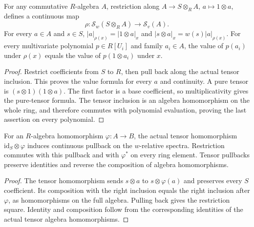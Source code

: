 \begin{theorem}
\label{spectrum:base-change-restriction}
\leanok
{}
For any commutative $R$-algebra $A$, restriction along
$A\to S\otimes_R A$, $a\mapsto1\otimes a$, defines a continuous map
\[
 \rho:\mathcal S_w(S\otimes_R A)\longrightarrow\mathcal S_v(A).
\]
For every $a\in A$ and $s\in S$,
$|a|_{\rho(x)}=|1\otimes a|_x$ and
$|s\otimes a|_x=w(s)|a|_{\rho(x)}$.
For every multivariate polynomial $p\in R[U_i]$ and family $a_i\in A$,
the value of $p(a_i)$ under $\rho(x)$ equals the value of
$p(1\otimes a_i)$ under $x$.
\end{theorem}
\begin{proof}
Restrict coefficients from $S$ to $R$, then pull back along the actual
tensor inclusion. This proves the value formula for every $a$ and
continuity. A pure tensor is $(s\otimes1)(1\otimes a)$.
The first factor is a base coefficient, so multiplicativity gives the
pure-tensor formula. The tensor inclusion is an algebra homomorphism
on the whole ring, and therefore commutes with polynomial evaluation,
proving the last assertion on every polynomial.
\end{proof}

\begin{theorem}
\label{spectrum:base-change-algebra-naturality}
\leanok
{}
For an $R$-algebra homomorphism $\varphi:A\to B$, the actual tensor
homomorphism $\mathrm{id}_S\otimes\varphi$ induces continuous pullback
on the $w$-relative spectra. Restriction commutes with this pullback
and with $\varphi^*$ on every ring element. Tensor pullbacks preserve
identities and reverse the composition of algebra homomorphisms.
\end{theorem}
\begin{proof}
The tensor homomorphism sends $s\otimes a$ to $s\otimes\varphi(a)$
and preserves every $S$ coefficient. Its composition with the right
inclusion equals the right inclusion after $\varphi$, as homomorphisms
on the full algebra. Pulling back gives the restriction square.
Identity and composition follow from the corresponding identities
of the actual tensor algebra homomorphisms.
\end{proof}

